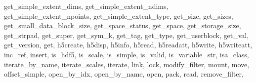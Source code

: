 {{        get_simple_extent_dims,%
        get_simple_extent_ndims,%
        get_simple_extent_npoints,%
        get_simple_extent_type,%
        get_size,%
        get_sizes,%
        get_small_data_block_size,%
        get_space_status,%
        get_space,%
        get_storage_size,%
        get_strpad,%
        get_super,%
        get_sym_k,%
        get_tag,%
        get_type,%
        get_userblock,%
        get_val,%
        get_version,%
        get,%
        h5create,%
        h5disp,%
        h5info,%
        h5read,%
        h5readatt,%
        h5write,%
        h5writeatt,%
        inc_ref,%
        insert,%
        is_hdf5,%
        is_scale,%
        is_simple,%
        is_valid,%
        is_variable_str,%
        isa_class,%
        iterate_by_name,%
        iterate_scales,%
        iterate,%
        link,%
        lock,%
        modify_filter,%
        mount,%
        move,%
        offset_simple,%
        open_by_idx,%
        open_by_name,%
        open,%
        pack,%
        read,%
        remove_filter,%
}}
